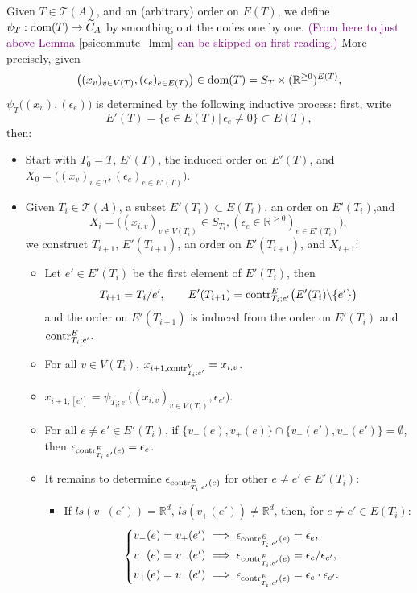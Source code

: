 \documentclass[11pt]{article}
\theoremstyle{definition}
\theoremstyle{remark}
\def\wt#1{\widetilde{#1}}
\def\R{\mathbb{R}}
\def\cT{\mathcal{T}}
\def\cmt#1{\textcolor{purple}{(#1)}}
\def\tn#1{\textnormal{#1}}
\begin{document}
Given $T\in\cT(A)$, and an (arbitrary) order on $E(T)$, 
we define $\psi_T:\tn{dom}(T)\to\wt{C}_A$  by smoothing out the nodes one by one. 
\cmt{From here to just above Lemma \ref{psicommute_lmm} can be skipped on first reading.}
More precisely, given $$\big((x_v)_{v\in V(T)},(\epsilon_{e})_{e\in E(T)}\big)\in\tn{dom}(T)=S_T\times(\R^{\ge0})^{E(T)},$$ 
$\psi_T\big((x_v),(\epsilon_{e})\big)$ is determined by the following inductive process: 
first, write 
$$E'(T)=\{e\in E(T)\big|\,\epsilon_e\neq0\}\subset E(T),$$
then: 
\begin{itemize}
\item Start with $T_0=T$, $E'(T)$, the induced order on $E'(T)$, and $X_0=\big((x_v)_{v\in T},(\epsilon_{e})_{e\in E'(T)}\big)$. 
\item Given $T_i\in\cT(A)$, a subset $E'(T_i)\subset E(T_i)$, an order on $E'(T_i)$,and $$X_i=\big((x_{i,v})_{v\in V(T_i)}\in S_{T_i},(\epsilon_{e}\in\R^{>0})_{e\in E'(T_i)}\big),$$ we construct $T_{i+1}$, $E'(T_{i+1})$, an order on $E'(T_{i+1})$, and $X_{i+1}$: 
\begin{itemize}
\item Let $e'\in E'(T_i)$ be the first element of $E'(T_i)$, then
$$T_{i+1}=T_i/e',\qquad E'(T_{i+1})=\tn{contr}^E_{T_i;e'}\big(E'(T_i)\backslash\{e'\}\big)$$
and the order on $E'(T_{i+1})$ is induced from the order on $E'(T_i)$ and $\tn{contr}^E_{T_i;e'}$.  
\item For all $v\in V(T_i)$, $x_{i+1,\tn{contr}^V_{T_i;e'}}=x_{i,v}$. 
\item $x_{i+1,[e']}=\psi_{T_i;e'}\big((x_{i,v})_{v\in V(T_i)},\epsilon_{e'}\big)$.
\item For all $e\neq e'\in E'(T_i)$, if $\{v_-(e),v_+(e)\}\cap \{v_-(e'),v_+(e')\}=\emptyset$, then $\epsilon_{\tn{contr}^E_{T_i;e'}(e)}=\epsilon_e$. 
\item It remains to determine $\epsilon_{\tn{contr}^E_{T_i;e'}(e)}$ for other $e\neq e'\in E'(T_i)$: 
\begin{itemize}
\item If $ls(v_-(e'))=\R^d$, $ls(v_+(e'))\neq\R^d$, then, for $e\neq e'\in E(T_i)$: 
$$\begin{cases}
v_-(e)=v_+(e')\implies \epsilon_{\tn{contr}^E_{T_i;e'}(e)}=\epsilon_e,\\
v_-(e)=v_-(e')\implies \epsilon_{\tn{contr}^E_{T_i;e'}(e)}=\epsilon_e/\epsilon_{e'},\\ 
v_+(e)=v_-(e')\implies \epsilon_{\tn{contr}^E_{T_i;e'}(e)}=\epsilon_e\cdot\epsilon_{e'}.
\end{cases}$$

\end{itemize}
\end{itemize}
\end{itemize}
\end{document}
